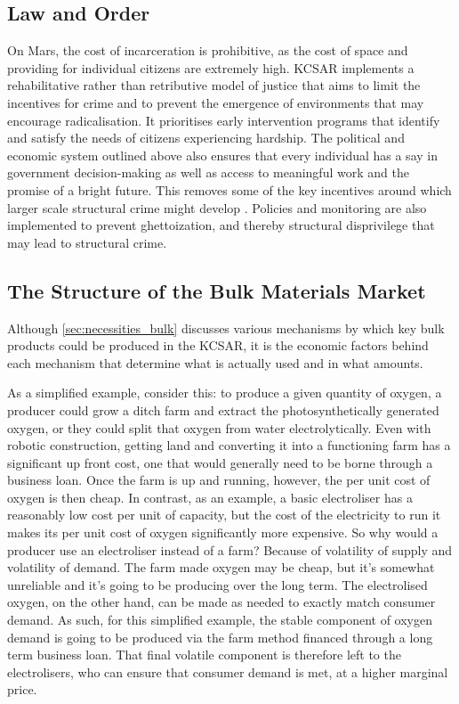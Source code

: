 \documentclass[fleqn,10pt]{Stylesheet} %
\begin{document}
\subsection{Law and Order}
On Mars, the cost of incarceration is prohibitive, as the cost of space and providing for individual citizens are extremely high. KCSAR implements a rehabilitative rather than retributive model of justice that aims to limit the incentives for crime and to prevent the emergence of environments that may encourage radicalisation. It prioritises early intervention programs that identify and satisfy the needs of citizens experiencing hardship. The political and economic system outlined above also ensures that every individual has a say in government decision-making as well as access to meaningful work and the promise of a bright future. This removes some of the key incentives around which larger scale structural crime might develop \cite{10.1093/bjc/azq067}. Policies and monitoring are also implemented to prevent ghettoization, and thereby structural disprivilege that may lead to structural crime. 
\subsection{The Structure of the Bulk Materials Market}
Although \ref{sec:necessities_bulk} discusses various mechanisms by which key bulk products could be produced in the KCSAR, it is the economic factors behind each mechanism that determine what is actually used and in what amounts.

As a simplified example, consider this: to produce a given quantity of oxygen, a producer could grow a ditch farm and extract the photosynthetically generated oxygen, or they could split that oxygen from water electrolytically. Even with robotic construction, getting land and converting it into a functioning farm has a significant up front cost, one that would generally need to be borne through a business loan. Once the farm is up and running, however, the per unit cost of oxygen is then cheap. In contrast, as an example, a basic electroliser has a reasonably low cost per unit of capacity, but the cost of the electricity to run it makes its per unit cost of oxygen significantly more expensive. So why would a producer use an electroliser instead of a farm? Because of volatility of supply and volatility of demand. The farm made oxygen may be cheap, but it's somewhat unreliable and it's going to be producing over the long term. The electrolised oxygen, on the other hand, can be made as needed to exactly match consumer demand. As such, for this simplified example, the stable component of oxygen demand is going to be produced via the farm method financed through a long term business loan. That final volatile component is therefore left to the electrolisers, who can ensure that consumer demand is met, at a higher marginal price.
\end{document}

